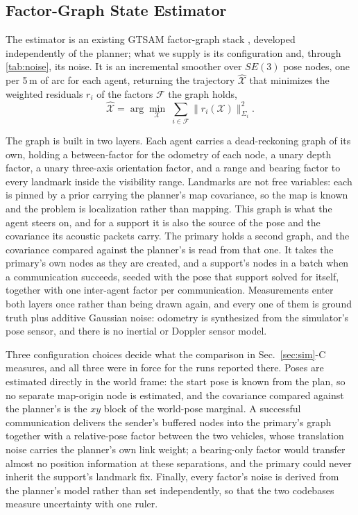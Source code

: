 \documentclass[letterpaper, 10 pt, conference]{ieeeconf}
\theoremstyle{remark}
\begin{document}
\subsection{Factor-Graph State Estimator}

The estimator is an existing GTSAM factor-graph stack
\cite{kaess2012isam2,dellaert2017factor}, developed independently of the
planner; what we supply is its configuration and, through
\cref{tab:noise}, its noise. It is an incremental smoother
\cite{kaess2012isam2} over $SE(3)$ pose nodes, one per 5\,m of arc for each
agent, returning the trajectory $\hat{\mathcal X}$ that minimizes the weighted
residuals $r_i$ of the factors $\mathcal F$ the graph holds,
\begin{equation}
  \hat{\mathcal X}=\arg\min_{\mathcal X}\;\sum_{i\in\mathcal F}
    \big\lVert r_i(\mathcal X)\big\rVert^{2}_{\Sigma_i}.
  \label{eq:fg}
\end{equation}

The graph is built in two layers. Each agent carries a dead-reckoning graph of
its own, holding a between-factor for the odometry of each node, a unary depth
factor, a unary three-axis orientation factor, and a range and bearing factor
to every landmark inside the visibility range. Landmarks are not free
variables: each is pinned by a prior carrying the planner's map covariance, so
the map is known and the problem is localization rather than mapping. This
graph is what the agent steers on, and for a support it is also the source of
the pose and the covariance its acoustic packets carry. The primary holds a
second graph, and the covariance compared against the planner's is read from
that one. It takes the primary's own nodes as they are created, and a
support's nodes in a batch when a communication succeeds, seeded with the pose
that support solved for itself, together with one inter-agent factor per
communication. Measurements enter both layers once rather than being drawn
again, and every one of them is ground truth plus additive Gaussian noise:
odometry is synthesized from the simulator's pose sensor, and there is no
inertial or Doppler sensor model.

Three configuration choices decide what the comparison in
Sec.~\ref{sec:sim}-C measures, and all three were in force for the runs
reported there. Poses are estimated directly in the world frame: the start
pose is known from the plan, so no separate map-origin node is estimated, and
the covariance compared against the planner's is the $xy$ block of the
world-pose marginal. A successful communication delivers the sender's
buffered nodes into the primary's graph together with a relative-pose factor
between the two vehicles, whose translation noise carries the planner's own
link weight; a bearing-only factor would transfer almost no position
information at these separations, and the primary could never inherit the
support's landmark fix. Finally, every factor's noise is derived from the
planner's model rather than set independently, so that the two codebases
measure uncertainty with one ruler.
\end{document}
